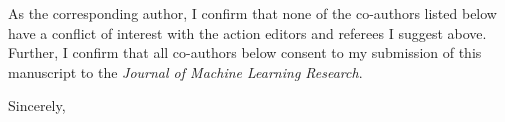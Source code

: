 As the corresponding author, I confirm that none of the co-authors listed below have a conflict of interest with the action editors and referees I suggest above. Further, I confirm that all co-authors below consent to my submission of this manuscript to the \emph{Journal of Machine Learning Research}.

\bigskip

Sincerely,

\medskip

\\









































